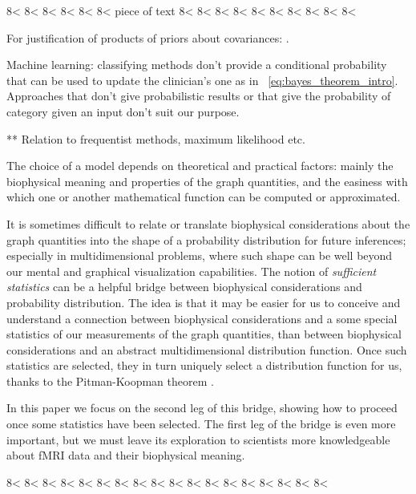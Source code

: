 8< 8< 8< 8< 8< 8< piece of text 8< 8< 8< 8< 8< 8< 8< 8< 8< 8< 


For justification of products of priors about covariances:
\citep{barnardetal2000} \citep[\sect~3.10]{jeffreys1946,jeffreys1939_r2003}
\citep{huzurbazar1956}.



Machine learning: classifying methods don't provide a conditional
probability that can be used to update the clinician's one as in
\eqn~\eqref{eq:bayes_theorem_intro}. Approaches that don't give
probabilistic results or that give the probability of category given an
input don't suit our purpose.

** Relation to frequentist methods, maximum likelihood etc.



The choice of a model depends on theoretical and
practical factors: mainly the biophysical meaning and properties of the graph
quantities, and the easiness with which one or another mathematical
function can be computed or approximated.

It is sometimes difficult to relate or translate biophysical considerations
about the graph quantities into the shape of a probability distribution for
future inferences; especially in multidimensional problems, where such
shape can be well beyond our mental and graphical visualization
capabilities. The notion of \emph{sufficient statistics} can be a helpful
bridge between biophysical considerations and probability distribution. The
idea is that it may be easier for us to conceive and understand a
connection between biophysical considerations and a some special statistics
of our measurements of the graph quantities, than between biophysical
considerations and an abstract multidimensional distribution function. Once
such statistics are selected, they in turn uniquely select a distribution
function for us, thanks to the Pitman-Koopman theorem
\citetext{\citealp{koopman1936,pitman1936,darmois1935}; see also also
  \citealp{hipp1974,andersen1970,denny1967,fraser1963,barankinetal1963}}.


In this paper we focus on the second leg of this bridge, showing how to
proceed once some statistics have been selected. The first leg of the
bridge is even more important, but we must leave its exploration to
scientists more knowledgeable about fMRI data and their biophysical
meaning.


8< 8< 8< 8< 8< 8< 8< 8< 8< 8< 8< 8< 8< 8< 8< 8< 8< 8< 

